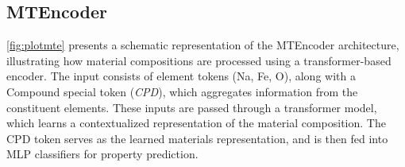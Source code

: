 

\subsection{MTEncoder}
\label{appendix_mte}
\cref{fig:plotmte} presents a schematic representation of the MTEncoder architecture, illustrating how material compositions are processed using a transformer-based encoder. The input consists of element tokens (Na, Fe, O), along with a Compound special token (\textit{CPD}), which aggregates information from the constituent elements. These inputs are passed through a transformer model, which learns a contextualized representation of the material composition. The CPD token serves as the learned materials representation, and is then fed into MLP classifiers for property prediction. %

